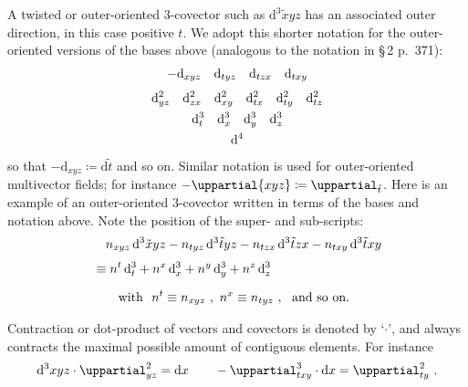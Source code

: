 \documentclass[\ifafour a4paper,12pt,\else a5paper,10pt,\fi%
onecolumn,oneside,article,%
british%
]{memoir}
\theoremstyle{remark}
\theoremstyle{innote}
\newcommand*{\de}{\uppartial}%
\newcommand*{\di}{\mathrm{d}}%
\newcommand*{\defd}{\coloneqq}
\renewcommand*{\|}[1][]{\nonscript\:#1\vert\nonscript\:\mathopen{}}
\newcommand*{\sect}{\S}%
\newcommand*{\se}[1]{\de_{#1}}
\newcommand*{\sse}[1]{\de^{2}_{#1}}
\newcommand*{\ssse}[1]{\de^{3}_{#1}}
\newcommand*{\si}[1]{\di{#1}}
\newcommand*{\sssi}[1]{\di^{3}{#1}}
\newcommand*{\tw}[1]{\tilde{#1}}
\newcommand*{\te}[1]{\de{#1}}
\newcommand*{\ti}[1]{\di_{#1}}
\newcommand*{\tti}[1]{\di^{2}_{#1}}
\newcommand*{\ttti}[1]{\di^{3}_{#1}}
\newcommand*{\tttti}[1]{\di^{4}_{#1}}
\begin{document}
A twisted or outer-oriented 3-covector such as $\sssi{\tw{x}yz}$ has an associated outer direction, in this case positive $t$. We adopt this shorter notation for the outer-oriented versions of the bases above (analogous to the notation in  \cites{gotayetal1992} \sect\,2 p.~371):
\begin{subequations}\label{eq:basis_twshort}
  \begin{gather}
    \label{eq:basis_1vec_twshort}
    -\ti{xyz}\quad
    \ti{tyz}\quad
    \ti{tzx}\quad
    \ti{txy}
    \\[\jot]
    \label{eq:basis_2vec_twshort}
    \tti{yz}\quad
    \tti{zx}\quad
    \tti{xy}\quad
    \tti{tx}\quad
    \tti{ty}\quad
    \tti{tz}
    \\
    \label{eq:basis_3vec_twshort}
    \ttti{t}\quad
    \ttti{x}\quad
    \ttti{y}\quad
    \ttti{z}
    \\
    \label{eq:basis_4vec_twshort}
    \tttti{}
  \end{gather}
\end{subequations}
so that $-\ti{xyz} \defd \si{\tw{t}}$ and so on. Similar notation is used for outer-oriented multivector fields; for instance $-\te{xyz} \defd \se{\tw{t}}$. Here is an example of an outer-oriented 3-covector written in terms of the bases and notation above. Note the position of the super- and sub-scripts:
\begin{equation}
  \label{eq:examples_expansion}
  \begin{split}
   &\quad n_{xyz}\,\sssi{\tw{x}yz}
    -n_{tyz}\,\sssi{\tw{t}yz}
    -n_{tzx}\,\sssi{\tw{t}zx}
    -n_{txy}\,\sssi{\tw{t}xy}
    \\[\jot]
    &\equiv
    n^{t}\,\ttti{t} +
    n^{x}\,\ttti{x} +
    n^{y}\,\ttti{y} +
    n^{z}\,\ttti{z}
    \\[2\jot]
    &\qquad\text{with }\ 
    n^{t} \equiv n_{xyz}\ ,\
    n^{x} \equiv n_{tyz}\ ,\
    \text{ and so on}.
  \end{split}
\end{equation}

\medskip

Contraction or dot-product of vectors and covectors is denoted by \enquote*{$\cdot$}, and always contracts the maximal possible amount of contiguous elements. For instance
\begin{equation}
  \label{eq:contraction_ex}
  \sssi{xyz} \cdot \sse{yz} = \si{x}
  \qquad
  -\ssse{txy} \cdot \si{x} = \sse{ty} \ .
\end{equation}
\end{document}
